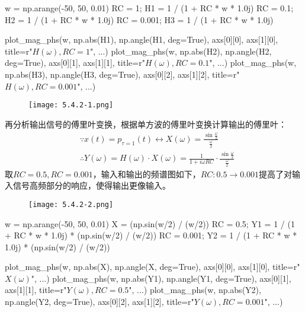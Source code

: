 \begin{python}
w  = np.arange(-50, 50, 0.01)
RC = 1;     H1 = 1 / (1 + RC * w * 1.0j)
RC = 0.1;   H2 = 1 / (1 + RC * w * 1.0j)
RC = 0.001; H3 = 1 / (1 + RC * w * 1.0j)

plot_mag_phs(w, np.abs(H1), np.angle(H1, deg=True),
             axs[0][0], axs[1][0], title=r"$H(\omega) ,RC=1$",     ...)
plot_mag_phs(w, np.abs(H2), np.angle(H2, deg=True),
             axs[0][1], axs[1][1], title=r"$H(\omega) ,RC=0.1$",   ...)
plot_mag_phs(w, np.abs(H3), np.angle(H3, deg=True),
             axs[0][2], axs[1][2], title=r"$H(\omega) ,RC=0.001$", ...)
\end{python}

\begin{figure}[h]
\centering
\texttt{[image: 5.4.2-1.png]}
\end{figure}

再分析输出信号的傅里叶变换，根据单方波的傅里叶变换计算输出的傅里叶：
\begin{align*}
&\because x\left( t \right) =p_{\tau =1}\left( t \right) \leftrightarrow X\left( \omega \right) =\frac{\sin \frac{\omega}{2}}{\frac{\omega}{2}} \\
&\therefore Y\left( \omega \right) =H\left( \omega \right) \cdot X\left( \omega \right) =\frac{1}{1+i\omega RC}\cdot \frac{\sin \frac{\omega}{2}}{\frac{\omega}{2}}
\end{align*}
取$RC=0.5,RC=0.001$，输入和输出的频谱图如下，$RC:0.5\rightarrow 0.001$提高了对输入信号高频部分的响应，使得输出更像输入。
\begin{figure}[h]
\centering
\texttt{[image: 5.4.2-2.png]}
\end{figure}

\begin{python}
w  = np.arange(-50, 50, 0.01)
X  = (np.sin(w/2) / (w/2))
RC = 0.5;   Y1 = 1 / (1 + RC * w * 1.0j) * (np.sin(w/2) / (w/2))
RC = 0.001; Y2 = 1 / (1 + RC * w * 1.0j) * (np.sin(w/2) / (w/2))

plot_mag_phs(w, np.abs(X),  np.angle(X, deg=True),
             axs[0][0], axs[1][0], title=r"$X(\omega)$",           ...)
plot_mag_phs(w, np.abs(Y1), np.angle(Y1, deg=True),
             axs[0][1], axs[1][1], title=r"$Y(\omega) ,RC=0.5$",   ...)
plot_mag_phs(w, np.abs(Y2), np.angle(Y2, deg=True),
             axs[0][2], axs[1][2], title=r"$Y(\omega) ,RC=0.001$", ...)
\end{python}




